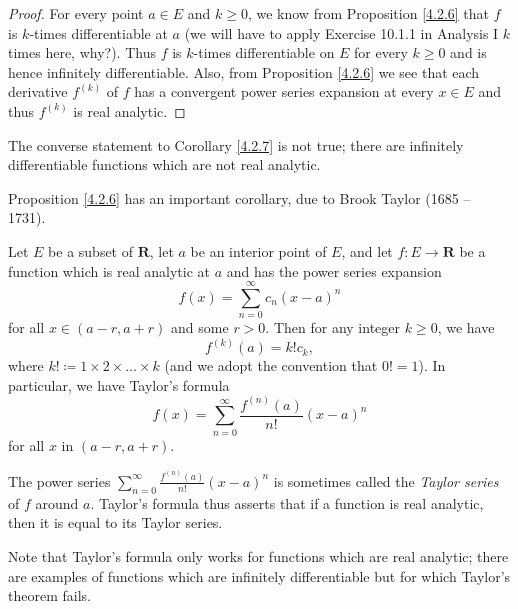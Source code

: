 \begin{proof}
    For every point \(a \in E\) and \(k \geq 0\), we know from Proposition \ref{4.2.6} that \(f\) is \(k\)-times differentiable at \(a\)
    (we will have to apply Exercise 10.1.1 in Analysis I \(k\) times here, why?).
    Thus \(f\) is \(k\)-times differentiable on \(E\) for every \(k \geq 0\) and is hence infinitely differentiable.
    Also, from Proposition \ref{4.2.6} we see that each derivative \(f^{(k)}\) of \(f\) has a convergent power series expansion at every \(x \in E\) and thus \(f^{(k)}\) is real analytic.
\end{proof}

\setcounter{theorem}{8}
\begin{remark}\label{4.2.9}
    The converse statement to Corollary \ref{4.2.7} is not true;
    there are infinitely differentiable functions which are not real analytic.
\end{remark}

\begin{note}
    Proposition \ref{4.2.6} has an important corollary, due to Brook Taylor (1685 -- 1731).
\end{note}

\begin{corollary}\label{4.2.10}
    Let \(E\) be a subset of \(\mathbf{R}\), let \(a\) be an interior point of \(E\), and let \(f : E \to \mathbf{R}\) be a function which is real analytic at \(a\) and has the power series expansion
    \[
        f(x) = \sum_{n = 0}^\infty c_n (x - a)^n
    \]
    for all \(x \in (a - r, a + r)\) and some \(r > 0\).
    Then for any integer \(k \geq 0\), we have
    \[
        f^{(k)}(a) = k! c_k,
    \]
    where \(k! \coloneqq 1 \times 2 \times \dots \times k\)
    (and we adopt the convention that \(0! = 1\)).
    In particular, we have Taylor's formula
    \[
        f(x) = \sum_{n = 0}^\infty \frac{f^{(n)}(a)}{n!} (x - a)^n
    \]
    for all \(x\) in \((a - r, a + r)\).
\end{corollary}

\begin{note}
    The power series \(\sum_{n = 0}^\infty \frac{f^{(n)}(a)}{n!} (x - a)^n\) is sometimes called the \emph{Taylor series} of \(f\) around \(a\).
    Taylor's formula thus asserts that if a function is real analytic, then it is equal to its Taylor series.
\end{note}

\begin{remark}\label{4.2.11}
    Note that Taylor's formula only works for functions which are real analytic;
    there are examples of functions which are infinitely differentiable but for which Taylor's theorem fails.
\end{remark}

